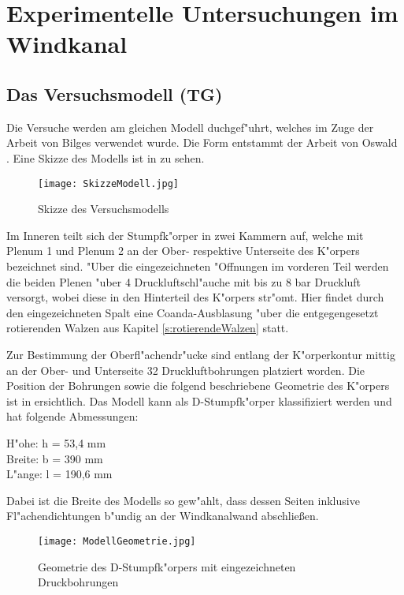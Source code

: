\chapter{Experimentelle Untersuchungen im Windkanal}
\label{s:versuche}
\section{Das Versuchsmodell (TG)}
\label{sec:Modell}
Die Versuche werden am gleichen Modell duchgef"uhrt, welches im Zuge der Arbeit von Bilges \cite{Bilges.2018} verwendet wurde. Die Form entstammt der Arbeit von Oswald \cite{Oswald.2017}. Eine Skizze des Modells ist in  zu sehen.

\begin{figure}[h]
	\centering
	\texttt{[image: SkizzeModell.jpg]}
	\caption{Skizze des Versuchsmodells \citep{Bilges.2018}}
	\label{fig:SkizzeModell}
\end{figure}

Im Inneren teilt sich der Stumpfk"orper in zwei Kammern auf, welche mit Plenum 1 und Plenum 2 an der Ober- respektive Unterseite des K"orpers bezeichnet sind. "Uber die eingezeichneten "Offnungen im vorderen Teil werden die beiden Plenen "uber 4 Druckluftschl"auche mit bis zu 8 bar Druckluft versorgt, wobei diese in den Hinterteil des K"orpers str"omt. Hier findet durch den eingezeichneten Spalt eine Coanda-Ausblasung "uber die entgegengesetzt rotierenden Walzen aus Kapitel \ref{s:rotierendeWalzen} statt.

Zur Bestimmung der Oberfl"achendr"ucke sind entlang der K"orperkontur mittig an der Ober- und Unterseite 32 Druckluftbohrungen platziert worden. Die Position der Bohrungen sowie die folgend beschriebene Geometrie des K"orpers ist in  ersichtlich. Das Modell kann als D-Stumpfk"orper klassifiziert werden und hat folgende Abmessungen: 
\begin{center}
H"ohe: h = 53,4 mm\\
Breite: b = 390 mm\\
L"ange: l = 190,6 mm\\ 
\end{center}
Dabei ist die Breite des Modells so gew"ahlt, dass dessen Seiten inklusive Fl"achendichtungen b"undig an der Windkanalwand abschlie\ss{}en. 

\begin{figure}[h]
	\centering
	\texttt{[image: ModellGeometrie.jpg]}
	\caption{Geometrie des D-Stumpfk"orpers mit eingezeichneten Druckbohrungen \citep{Bilges.2018}}
	\label{fig:ModellGeometrie}
\end{figure}

